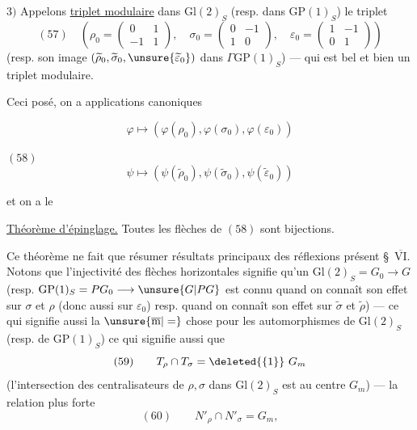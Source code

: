  $3)$ Appelons \uline{triplet modulaire}
\uline{} dans $\mathrm{Gl}(2)_S$
(resp. dans $\mathrm{GP}(1)_S$) le triplet
\[
(57)\quad\left(\rho_0=\begin{pmatrix}0&1\\-1&1\end{pmatrix},\quad
\sigma_0=\begin{pmatrix}0&-1\\1&0\end{pmatrix},\quad
\varepsilon_0=\begin{pmatrix}1&-1\\0&1\end{pmatrix}\right)
\]
(resp. son image $(\widetilde\rho_0,\widetilde\sigma_0,
\unsure{\widetilde\varepsilon_0})$ dans $\Gamma\mathrm{GP}(1)_S$) ---
qui est bel et bien un triplet modulaire.

Ceci posé, on a applications
canoniques


\[
\varphi\longmapsto(\varphi(\rho_0),\varphi(\sigma_0),\varphi(\varepsilon_0))
\]

$(58)$
\[
\psi\longmapsto(\psi(\widetilde\rho_0),\psi(\widetilde\sigma_0),
\psi(\widetilde\varepsilon_0))
\]

et on a le

\uline{Théorème d'épinglage.} Toutes les flèches de $(58)$ sont bijections.

Ce théorème ne fait que résumer 
 résultats principaux des réflexions
 présent \S\ \uline{$\overline{\mathrm{VI}}$}.
Notons que l'injectivité des flèches horizontales signifie 
qu'un 
$\mathrm{Gl}(2)_S=G_0\longrightarrow G$
(resp. $\mathrm{GP}(1)_S=PG_0\longrightarrow\unsure{G|PG}$
est connu quand on connaît son effet sur $\sigma$ et $\rho$
(donc aussi sur $\varepsilon_0$)
\unsure{$\leftarrow$} resp. quand on connaît son effet sur
$\widetilde\sigma$ et $\widetilde\rho$) --- ce qui signifie aussi
la $\unsure{\overline{\mathrm m}|=}$ chose pour les automorphismes de
$\mathrm{Gl}(2)_S$ (resp. de $\mathrm{GP}(1)_S$)
ce qui signifie aussi que
\[
(59)\qquad T_\rho\cap T_\sigma=\deleted{\{1\}}\ G_m
\]
(l'intersection des centralisateurs de $\rho,\sigma$ dans
$\mathrm{Gl}(2)_S$ est  au centre $G_m$) ---
 la relation plus forte
\[
(60)\qquad N'_\rho\cap N'_\sigma=G_m,
\]

